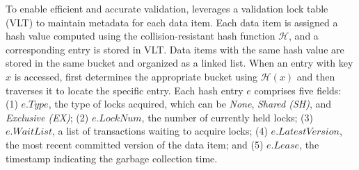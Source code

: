 To enable efficient and accurate validation, \sysname leverages a validation lock table (VLT) to maintain metadata for each data item. Each data item is assigned a hash value computed using the collision-resistant hash function $\mathcal{H}$, and a corresponding entry is stored in VLT. 
Data items with the same hash value are stored in the same bucket and organized as a linked list. When an entry with key \( x \) is accessed, \sysname first determines the appropriate bucket using \( \mathcal{H}(x) \) and then traverses it to locate the specific entry. 
Each hash entry $e$ comprises five fields: (1) $e.Type$, the type of locks acquired, which can be \textit{None}, \textit{Shared (SH)}, and \textit{Exclusive (EX)}; (2) $e.LockNum$, the number of currently held locks; (3) $e.WaitList$, a list of transactions waiting to acquire locks; (4) $e.LatestVersion$, the most recent committed version of the data item; and (5) $e.Lease$, the timestamp indicating the garbage collection time. 




